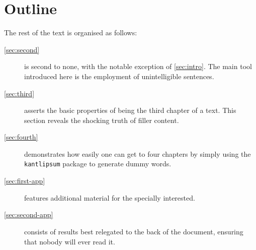 \section{Outline}

The rest of the text is organised as follows:
\begin{description}
    \item[\cref{sec:second}]
    is second to none, with the notable exception of \cref{sec:intro}.
    The main tool introduced here is the employment of unintelligible sentences.

    \item[\cref{sec:third}]
    asserts the basic properties of being the third chapter of a text.
    This section reveals the shocking truth of filler content.

    \item[\cref{sec:fourth}]
    demonstrates how easily one can get to four chapters by simply using
    the \texttt{kantlipsum} package to generate dummy words.

    \item[\cref{sec:first-app}]
    features additional material for the specially interested.

    \item[\cref{sec:second-app}]
    consists of results best relegated to the back of the document,
    ensuring that nobody will ever read it.
\end{description}